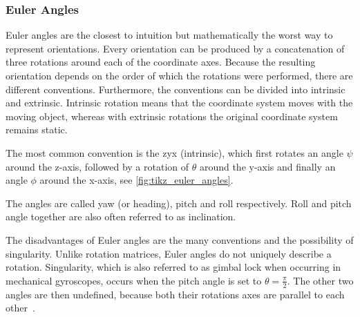 \subsubsection{Euler Angles}
Euler angles are the closest to intuition but mathematically the worst way to represent orientations.
Every orientation can be produced by a concatenation of three rotations around each of the coordinate axes.
Because the resulting orientation depends on the order of which the rotations were performed, there are different conventions.
Furthermore, the conventions can be divided into intrinsic and extrinsic.
Intrinsic rotation means that the coordinate system moves with the moving object, whereas with extrinsic rotations the original coordinate system remains static.

The most common convention is the zyx (intrinsic), which first rotates an angle $\psi$ around the z-axis, followed by a rotation of $\theta$ around the y-axis and finally an angle $\phi$ around the x-axis, see \cref{fig:tikz_euler_angles}.
\begin{figure}[t]
    {}
\end{figure}
The angles are called yaw (or heading), pitch and roll respectively. Roll and pitch angle together are also often referred to as inclination.

The disadvantages of Euler angles are the many conventions and the possibility of singularity.
Unlike rotation matrices, Euler angles do not uniquely describe a rotation.
Singularity, which is also referred to as gimbal lock when occurring in mechanical gyroscopes, occurs when the pitch angle is set to $\theta = \frac{\pi}{2}$.
The other two angles are then undefined, because both their rotations axes are parallel to each other~\cite{Kok2017}.

